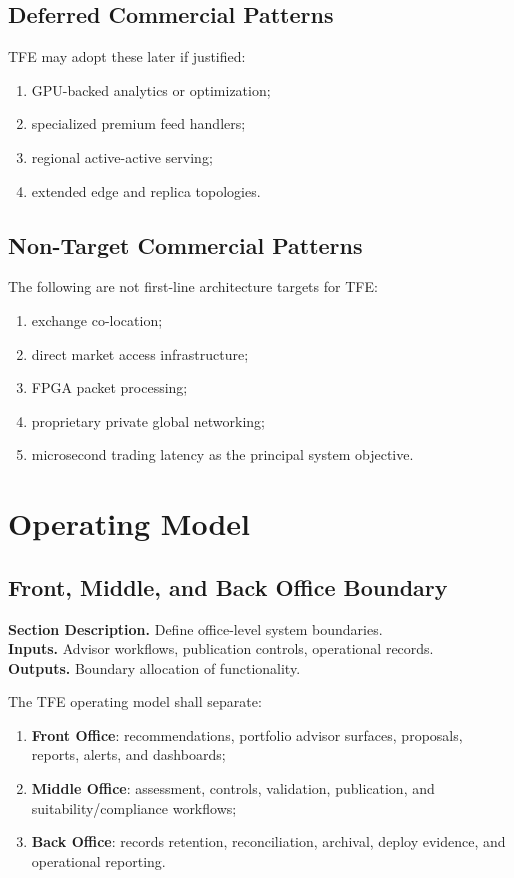 \documentclass[11pt]{report}
\newcommand{\meta}[3]{\textbf{Section Description.} #1\\
\textbf{Inputs.} #2\\
\textbf{Outputs.} #3\par}
\begin{document}
\section{Deferred Commercial Patterns}
TFE may adopt these later if justified:
\begin{enumerate}[leftmargin=1.2cm]
    \item GPU-backed analytics or optimization;
    \item specialized premium feed handlers;
    \item regional active-active serving;
    \item extended edge and replica topologies.
\end{enumerate}

\section{Non-Target Commercial Patterns}
The following are not first-line architecture targets for TFE:
\begin{enumerate}[leftmargin=1.2cm]
    \item exchange co-location;
    \item direct market access infrastructure;
    \item FPGA packet processing;
    \item proprietary private global networking;
    \item microsecond trading latency as the principal system objective.
\end{enumerate}

\chapter{Operating Model}
\section{Front, Middle, and Back Office Boundary}
\meta{Define office-level system boundaries.}{Advisor workflows, publication controls, operational records.}{Boundary allocation of functionality.}

The TFE operating model shall separate:
\begin{enumerate}[leftmargin=1.2cm]
    \item \textbf{Front Office}: recommendations, portfolio advisor surfaces, proposals, reports, alerts, and dashboards;
    \item \textbf{Middle Office}: assessment, controls, validation, publication, and suitability/compliance workflows;
    \item \textbf{Back Office}: records retention, reconciliation, archival, deploy evidence, and operational reporting.
\end{enumerate}
\end{document}
